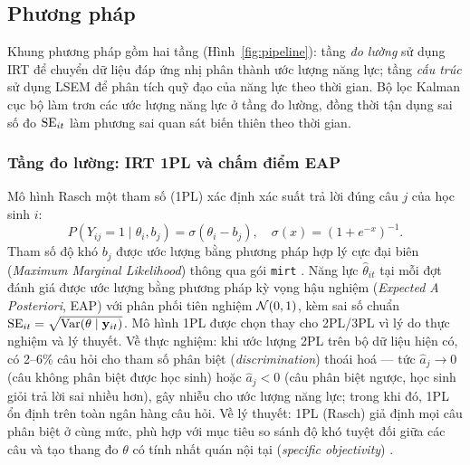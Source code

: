 
\subsection{Phương pháp}
\label{sec:methods}

Khung phương pháp gồm hai tầng (Hình~\ref{fig:pipeline}): tầng \emph{đo lường} sử dụng IRT để chuyển dữ liệu đáp ứng nhị phân thành ước lượng năng lực; tầng \emph{cấu trúc} sử dụng LSEM để phân tích quỹ đạo của năng lực theo thời gian. Bộ lọc Kalman cục bộ làm trơn các ước lượng năng lực ở tầng đo lường, đồng thời tận dụng sai số đo \(\mathrm{SE}_{it}\) làm phương sai quan sát biến thiên theo thời gian.

\subsubsection{Tầng đo lường: IRT 1PL và chấm điểm EAP}

Mô hình Rasch một tham số (1PL) xác định xác suất trả lời đúng câu \(j\) của học sinh \(i\):
\begin{equation}
P(Y_{ij}=1 \mid \theta_i, b_j) = \sigma(\theta_i - b_j), \quad \sigma(x) = (1+e^{-x})^{-1}.
\label{eq:1pl}
\end{equation}
Tham số độ khó \(b_j\) được ước lượng bằng phương pháp hợp lý cực đại biên (\emph{Maximum Marginal Likelihood}) thông qua gói \texttt{mirt} \cite{chalmers2012}. Năng lực \(\hat{\theta}_{it}\) tại mỗi đợt đánh giá được ước lượng bằng phương pháp kỳ vọng hậu nghiệm (\emph{Expected A Posteriori}, EAP) với phân phối tiên nghiệm \(\mathcal{N}(0,1)\), kèm sai số chuẩn \(\mathrm{SE}_{it} = \sqrt{\mathrm{Var}(\theta\mid\mathbf{y}_{it})}\). Mô hình 1PL được chọn thay cho 2PL/3PL vì lý do thực nghiệm và lý thuyết. Về thực nghiệm: khi ước lượng 2PL trên bộ dữ liệu hiện có, có 2--6\% câu hỏi cho tham số phân biệt (\emph{discrimination}) thoái hoá --- tức $\hat a_j \to 0$ (câu không phân biệt được học sinh) hoặc $\hat a_j < 0$ (câu phân biệt ngược, học sinh giỏi trả lời sai nhiều hơn), gây nhiễu cho ước lượng năng lực; trong khi đó, 1PL ổn định trên toàn ngân hàng câu hỏi. Về lý thuyết: 1PL (Rasch) giả định mọi câu phân biệt ở cùng mức, phù hợp với mục tiêu so sánh độ khó tuyệt đối giữa các câu và tạo thang đo \(\theta\) có tính nhất quán nội tại (\emph{specific objectivity}) \cite{lord1980}.

